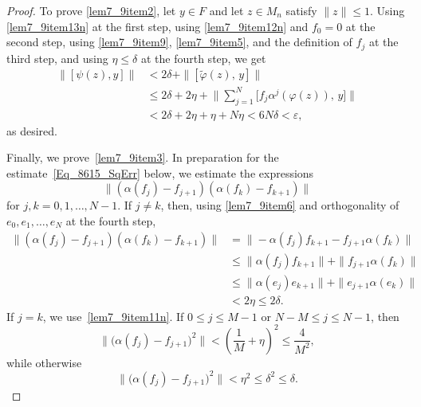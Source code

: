 \documentclass[11pt]{amsart}
\theoremstyle{plain}
\theoremstyle{definition}
\theoremstyle{remark}
\numberwithin{equation}{section}
\newcommand{\dt}{\delta}
\newcommand{\et}{\eta}
\begin{document}
\begin{proof}
To prove \ref{lem7_9item2}, let $y \in {F}$
and let $z \in M_{n}$ satisfy $\| z \| \leq 1$.
Using \eqref{lem7_9item13n} at the first step,
using \eqref{lem7_9item12n} and $f_0 = 0$ at the second step,
using \eqref{lem7_9item9}, \eqref{lem7_9item5},
and the definition of $f_j$ at the third step,
and
using $\et \leq \dt$ at the fourth step,
we get
%
\begin{align*}
\|[\psi (z), y] \|
& < 2 \delta + \| [\widetilde{\varphi} (z), \, y ] \|
\\
& \leq2 \delta + 2 \eta +
  \Bigg\| \sum_{j = 1}^{N}
        \big[ f_{j} \alpha^{j} (\varphi (z)), \, y \big] \Bigg\|
\\
& < 2 \delta + 2 \eta + \eta + N \eta
  < 6 N \delta
  < \varepsilon,
\end{align*}
%
as desired.

Finally, we prove~\ref{lem7_9item3}.
In preparation for the estimate~\eqref{Eq_8615_SqErr} below,
we estimate the expressions
\[
\big\| (\alpha (f_{j}) - f_{j + 1}) (\alpha (f_{k}) - f_{k + 1}) \big\|
\]
for $j, k = 0, 1, \ldots, N - 1$.
If $j \neq k$,
then,
using \eqref{lem7_9item6}
and orthogonality of $e_0, e_1, \ldots, e_N$ at the fourth step,
%
\begin{align*}
\big\| (\alpha (f_{j}) - f_{j + 1}) (\alpha (f_{k}) - f_{k + 1}) \big\|
& =  \big\| - \alpha (f_{j}) f_{k + 1} - f_{j + 1} \alpha (f_{k}) \big\|
\\
& \leq \| \alpha (f_{j}) f_{k + 1} \| + \| f_{j + 1} \alpha (f_{k}) \|
\\
& \leq \| \alpha (e_{j}) e_{k + 1} \| + \| e_{j + 1} \alpha (e_{k}) \|
\\
& < 2 \eta
  \leq 2 \dt.
\end{align*}
%
If $j = k$,
we use~\eqref{lem7_9item11n}.
If $0 \leq j \leq M - 1$
or $N - M \leq j \leq N - 1$,
then
\[
\big\| \big( \alpha (f_{j}) - f_{j + 1} \big)^2 \big\|
  < \left( \frac{1}{M} + \et \right)^2
  \leq \frac{4}{M^2},
\]
while otherwise
\[
\big\| \big( \alpha (f_{j}) - f_{j + 1} \big)^2 \big\|
  < \et^2
  \leq \dt^2
  \leq \dt.
\]


\end{proof}
\end{document}

